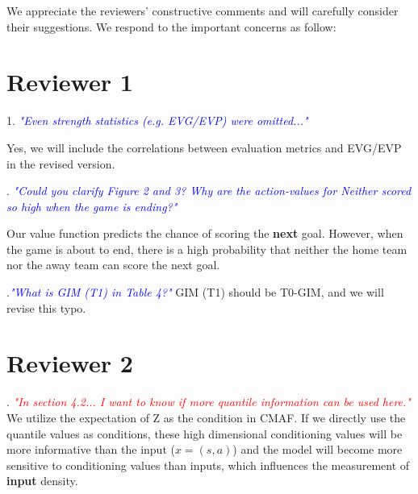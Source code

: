\documentclass{article}
\begin{document}
We appreciate the reviewers' constructive comments and will carefully consider their suggestions. We respond to the important concerns as follow:
\vspace{-0.1in}
\section{Reviewer 1}
1. \textcolor{blue}{\it "Even strength statistics (e.g. EVG/EVP) were omitted..."}

\noindent Yes, we will include the correlations between evaluation metrics and EVG/EVP in the revised version.

. 
\textcolor{blue}{\it "Could you clarify Figure 2 and 3? Why are the action-values for Neither scored so high when the game is ending?"}

\noindent Our value function predicts the chance of scoring the {\bf next} goal.
However, when the game is about to end, there is a high probability that neither the home team nor the away team can score the next goal.

.\textcolor{blue}{\it "What is GIM (T1) in Table 4?"}
\noindent GIM (T1) should be T0-GIM, and we will revise this typo.


\vspace{-0.1in}
\section{Reviewer 2}
. \textcolor{red}{\it "In section 4.2... I want to know if more quantile information can be used here."} 
We utilize the expectation of Z as the condition in CMAF. 
If we directly use the quantile values as conditions, these  high dimensional conditioning values will be more informative than the input ($x=(s,a)$) and the model will become more sensitive to conditioning values than inputs, which influences the measurement of {\bf input} density. 
\end{document}
